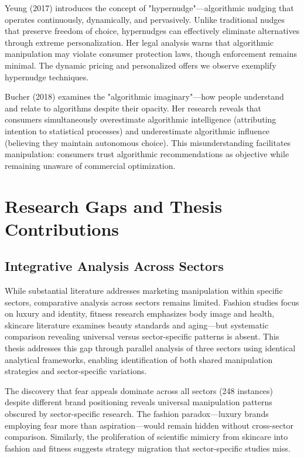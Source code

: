 Yeung (2017) introduces the concept of "hypernudge"—algorithmic nudging that operates continuously, dynamically, and pervasively. Unlike traditional nudges that preserve freedom of choice, hypernudges can effectively eliminate alternatives through extreme personalization. Her legal analysis warns that algorithmic manipulation may violate consumer protection laws, though enforcement remains minimal. The dynamic pricing and personalized offers we observe exemplify hypernudge techniques.

Bucher (2018) examines the "algorithmic imaginary"—how people understand and relate to algorithms despite their opacity. Her research reveals that consumers simultaneously overestimate algorithmic intelligence (attributing intention to statistical processes) and underestimate algorithmic influence (believing they maintain autonomous choice). This misunderstanding facilitates manipulation: consumers trust algorithmic recommendations as objective while remaining unaware of commercial optimization.

\section{Research Gaps and Thesis Contributions}
\label{sec:gaps}

\subsection{Integrative Analysis Across Sectors}

While substantial literature addresses marketing manipulation within specific sectors, comparative analysis across sectors remains limited. Fashion studies focus on luxury and identity, fitness research emphasizes body image and health, skincare literature examines beauty standards and aging—but systematic comparison revealing universal versus sector-specific patterns is absent. This thesis addresses this gap through parallel analysis of three sectors using identical analytical frameworks, enabling identification of both shared manipulation strategies and sector-specific variations.

The discovery that fear appeals dominate across all sectors (248 instances) despite different brand positioning reveals universal manipulation patterns obscured by sector-specific research. The fashion paradox—luxury brands employing fear more than aspiration—would remain hidden without cross-sector comparison. Similarly, the proliferation of scientific mimicry from skincare into fashion and fitness suggests strategy migration that sector-specific studies miss.

